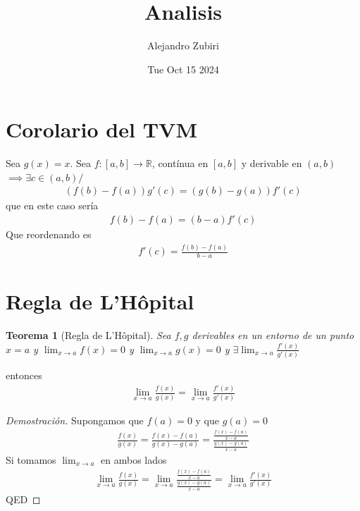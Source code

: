\documentclass{article}
\author{Alejandro Zubiri}
\date{Tue Oct 15 2024}
\title{Analisis}
\newtheorem*{lhopital}{Teorema}
\begin{document}
\maketitle
\tableofcontents
\pagebreak
\section{Corolario del TVM}
Sea $g(x)=x$. Sea $f:[a,b] \to \mathbb{R}$, contínua en $[a,b]$ y derivable en $(a,b)$ 
$ \implies \exists c \in (a,b) /$
\begin{equation}
    \begin{split}
        (f(b)-f(a))g'(c) = (g(b) - g(a))f'(c)
    \end{split}
\end{equation}
que en este caso sería
\begin{equation}
    \begin{split}
        f(b)-f(a)=(b-a)f'(c)
    \end{split}
\end{equation}
Que reordenando es
\begin{equation}
    \begin{split}
        f'(c)= \frac{f(b)-f(a)}{b-a}
    \end{split}
\end{equation}
\section{Regla de L'Hôpital}
\begin{lhopital}[Regla de L'Hôpital]
    Sea $f,g$ derivables en un entorno de un punto $x=a$ y $\lim_{x \to a}f(x)=0$ y
    $\lim_{x \to a}g(x)=0$ y $\exists \lim_{x \to a} \frac{f'(x)}{g'(x)}$
\end{lhopital}
entonces
\begin{equation}
    \begin{split}
        \lim_{x \to a} \frac{f(x)}{g(x)}= \lim_{x \to a} \frac{f'(x)}{g'(x)}
    \end{split}
\end{equation}
\begin{proof}[Demostración]
    Supongamos que $f(a)=0$ y que $g(a)=0$
    \begin{equation}
        \begin{split}
            \frac{f(x)}{g(x)} = \frac{f(x)-f(a)}{g(x)-g(a)} = \frac{\frac{f(x)-f(a)}{x-a}}{\frac{g(x)-g(a)}{x-a}}
        \end{split}
    \end{equation}
    Si tomamos $\lim_{x \to a}$ en ambos lados
    \begin{equation}
        \begin{split}
            \lim_{x \to a} \frac{f(x)}{g(x)} = \lim_{x \to a} \frac{\frac{f(x)-f(a)}{x-a}}{\frac{g(x)-g(a)}{x-a}}
            = \lim_{x \to a} \frac{f'(x)}{g'(x)}
        \end{split}
    \end{equation}
    QED
\end{proof}
\end{document}
